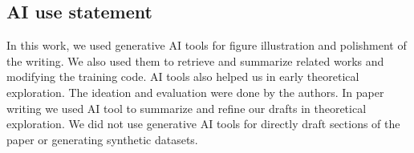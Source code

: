 \subsection*{AI use statement}

In this work, we used generative AI tools for figure illustration and polishment of the writing. We also used them to retrieve and summarize related works and modifying the training code. AI tools also helped us in early theoretical exploration. The ideation and evaluation were done by the authors. In paper writing we used AI tool to summarize and refine our drafts in theoretical exploration. We did not use generative AI tools for directly draft sections of the paper or generating synthetic datasets.
